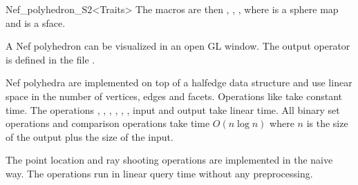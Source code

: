 \begin{ccRefClass}{Nef_polyhedron_S2<Traits>}
The macros are then ,
, ,
 where  is a sphere map
and  is a sface.

 A Nef polyhedron  can be
visualized in an open GL window. The output operator is defined in the
file .
   
\ccImplementation

Nef polyhedra are implemented on top of a halfedge data structure and
use linear space in the number of vertices, edges and facets.
Operations like  take constant time. The operations
, , , ,
, , input and output take linear
time. All binary set operations and comparison operations take time
$O(n \log n)$ where $n$ is the size of the output plus the size of the
input.

The point location and ray shooting operations are implemented in the
naive way. The operations run in linear query time without any
preprocessing.



\end{ccRefClass}


